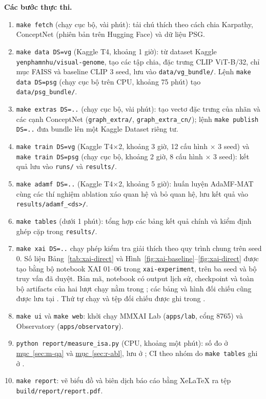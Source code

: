 \documentclass[conference]{IEEEtran}
\begin{document}
\textbf{Các bước thực thi.}
\begin{enumerate}
\item \texttt{make fetch} (chạy cục bộ, vài phút): tải chú thích theo cách chia Karpathy, ConceptNet (phiên bản trên Hugging Face) và dữ liệu PSG.
\item \texttt{make data DS=vg} (Kaggle T4, khoảng 1 giờ): từ dataset Kaggle \texttt{yenphamnhu/visual-genome}, tạo các tập chia, đặc trưng CLIP ViT-B/32, chỉ mục FAISS và baseline CLIP 3 seed, lưu vào \texttt{data/vg\_bundle/}. Lệnh \texttt{make data DS=psg} (chạy cục bộ trên CPU, khoảng 75 phút) tạo \texttt{data/psg\_bundle/}.
\item \texttt{make extras DS=..} (chạy cục bộ, vài phút): tạo vectơ đặc trưng của nhãn và các cạnh ConceptNet (\texttt{graph\_extra/}, \texttt{graph\_extra\_cn/}); lệnh \texttt{make publish DS=..} đưa bundle lên một Kaggle Dataset riêng tư.
\item \texttt{make train DS=vg} (Kaggle T4$\times$2, khoảng 3 giờ, 12 cấu hình $\times$ 3 seed) và \texttt{make train DS=psg} (chạy cục bộ, khoảng 2 giờ, 8 cấu hình $\times$ 3 seed): kết quả lưu vào \texttt{runs/} và \texttt{results/}.
\item \texttt{make adamf DS=..} (Kaggle T4$\times$2, khoảng 5 giờ): huấn luyện AdaMF-MAT cùng các thí nghiệm ablation xáo quan hệ và bỏ quan hệ, lưu kết quả vào \texttt{results/adamf\_<ds>/}.
\item \texttt{make tables} (dưới 1 phút): tổng hợp các bảng kết quả chính và kiểm định ghép cặp trong \texttt{results/}.
\item \texttt{make xai DS=..} chạy phép kiểm tra giải thích theo quy trình chung trên seed 0. Số liệu Bảng~\ref{tab:xai-direct} và Hình~\ref{fig:xai-baseline}--\ref{fig:xai-direct} được tạo bằng bộ notebook XAI 01--06 trong \texttt{xai-experiment}, trên ba seed và bộ truy vấn đã duyệt. Bản mã, notebook có output lịch sử, checkpoint và toàn bộ artifacts của hai lượt chạy nằm trong ; các bảng và hình đối chiếu cũng được lưu tại . Thứ tự chạy và tệp đối chiếu được ghi trong .
\item \texttt{make ui} và \texttt{make web}: khởi chạy MMXAI Lab (\texttt{apps/lab}, cổng 8765) và Observatory (\texttt{apps/observatory}).
\item \texttt{python report/measure\_isa.py} (CPU, khoảng một phút): số đo ở \hyperref[sec:m-qa]{mục~\ref*{sec:m-qa}} và \hyperref[sec:r-abl]{mục~\ref*{sec:r-abl}}, lưu ở ; CI theo nhóm do \texttt{make tables} ghi ở .
\item \texttt{make report}: vẽ biểu đồ và biên dịch báo cáo bằng XeLaTeX ra tệp \texttt{build/report/report.pdf}.
\end{enumerate}
\end{document}
